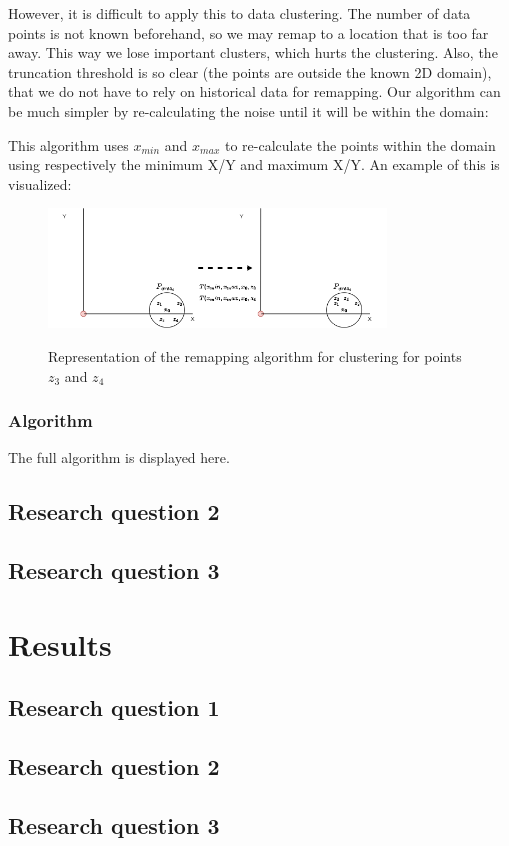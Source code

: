 However, it is difficult to apply this to data clustering.
The number of data points is not known beforehand, so we may remap to a location that is too far away.
This way we lose important clusters, which hurts the clustering.
Also, the truncation threshold is so clear (the points are outside the known 2D domain), that we do not have to rely on historical data for remapping.
Our algorithm can be much simpler by re-calculating the noise until it will be within the domain:

This algorithm uses $x_{min}$ and $x_{max}$ to re-calculate the points within the domain using respectively the minimum X/Y and maximum X/Y.
An example of this is visualized:
\begin{figure}[h]
  \includegraphics[width=0.8\textwidth]{Method/images/truncation-rq1.png}
  \label{fig:truncation}
  \centering
  \caption{Representation of the remapping algorithm for clustering for points $z_3$ and $z_4$ }
\end{figure}

\subsubsection{Algorithm}
The full algorithm is displayed here.


\subsection{Research question 2}
\subsection{Research question 3}
\section{Results}
\subsection{Research question 1}
\subsection{Research question 2}
\subsection{Research question 3}